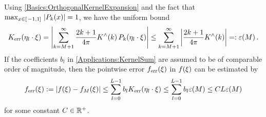 Using \eqref{Basics:OrthogonalKernelExpansion} and the fact that $\max_{x \in \left[\left.-1,1\right]\right.} \left\vert P_{k}{\hspace{-0.4ex}}\left(x\right)\right\vert = 1$, we have the uniform bound
\[
  K_{\text{\textsl{err}}}{\hspace{-0.4ex}}\left(\mathbf{\eta}_{l} \cdot \mathbf{\xi}\right) 
  = \left\vert\sum_{k = M+1}^{\infty} \frac{2k+1}{4\pi} K^{\wedge}{\hspace{-0.4ex}}\left(k\right) P_k{\hspace{-0.4ex}}\left(\mathbf{\eta}_{l} \cdot \mathbf{\xi}\right)\right\vert 
  \le \sum_{k = M+1}^{\infty} \left\vert\frac{2k+1}{4\pi} K^{\wedge}{\hspace{-0.4ex}}\left(k\right)\right\vert =: \varepsilon{\hspace{-0.4ex}}\left(M\right).
\]
If the coefficients $b_{l}$ in \eqref{Applications:KernelSum} are assumed to be of comparable order of magnitude, then the pointwise error $f_{\text{\textsl{err}}}{\hspace{-0.4ex}}\left(\xi\right)$ in $f{\hspace{-0.4ex}}\left(\mathbf{\xi}\right)$ can be estimated by
\[
  f_{\text{\textsl{err}}}{\hspace{-0.4ex}}\left(\xi\right) := \left\vert f{\hspace{-0.4ex}}\left(\xi\right) - f_{M}{\hspace{-0.4ex}}\left(\xi\right)\right\vert 
  \le \sum_{l=0}^{L-1} b_{l} K_{\text{\textsl{err}}}{\hspace{-0.4ex}}\left(\mathbf{\eta}_{l} \cdot \mathbf{\xi}\right)
  \le \sum_{l=0}^{L-1} b_{l} \varepsilon{\hspace{-0.4ex}}\left(M\right)
  \le C L \varepsilon{\hspace{-0.4ex}}\left(M\right)
\]
for some constant $C \in \mathbb{R}^{+}$.

